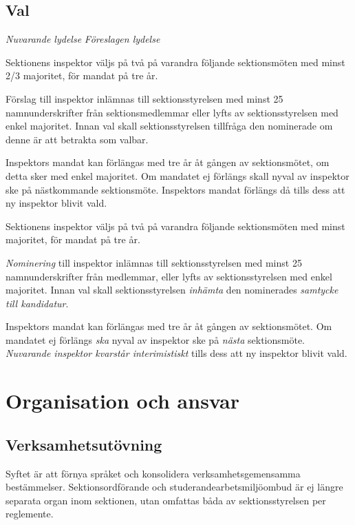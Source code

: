\documentclass{article}
\newenvironment{lydelse}
    {\begin{paracol}{2}%
        \emph{Nuvarande lydelse}%
        \switchcolumn%
        \emph{Föreslagen lydelse}%
    \end{paracol}%
    \begin{enumerate}[label=\thesubsection.\arabic*]%
    \begin{paracol}{2}%
    }{\end{paracol}\end{enumerate}}
\newcommand{\itemb}{\item[\textbullet]}
\begin{document}
\subsection{Val}
\begin{lydelse}
    \itemb Sektionens inspektor väljs på två på varandra följande sektionsmöten med minst 2/3 majoritet, för mandat på tre år. 
	
	\itemb Förslag till inspektor inlämnas till sektionsstyrelsen med minst 25 namnunderskrifter från sektionsmedlemmar eller lyfts av sektionsstyrelsen med enkel majoritet. Innan val skall sektionsstyrelsen tillfråga den nominerade om denne är att betrakta som valbar.
	
    \itemb Inspektors mandat kan förlängas med tre år åt gången av sektionsmötet, om detta sker med enkel majoritet. Om mandatet ej förlängs skall nyval av inspektor ske på nästkommande sektionsmöte. Inspektors mandat förlängs då tills dess att ny inspektor blivit vald.
    
  \switchcolumn
  \setcounter{enumi}{0}
    \item Sektionens inspektor väljs på två på varandra följande sektionsmöten med minst  majoritet, för mandat på tre år. \label{maj:in} 
	
	\item \emph{Nominering} till inspektor inlämnas till sektionsstyrelsen med minst 25 namnunderskrifter från medlemmar, eller lyfts av sektionsstyrelsen med enkel majoritet.
    Innan val skall sektionsstyrelsen \emph{inhämta} den nominerades \emph{samtycke till kandidatur}.
	
	\item Inspektors mandat kan förlängas med tre år åt gången av sektionsmötet.
    Om mandatet ej förlängs \emph{ska} nyval av inspektor ske på \emph{nästa} sektionsmöte.
	\emph{Nuvarande inspektor kvarstår interimistiskt} tills dess att ny inspektor blivit vald.
\end{lydelse}




\section{Organisation och ansvar}
\subsection{Verksamhetsutövning}
Syftet är att förnya språket och konsolidera verksamhetsgemensamma bestämmelser.
Sektionsordförande och studerandearbetsmiljöombud är ej längre separata organ inom sektionen, utan omfattas båda av sektionsstyrelsen per reglemente.
\end{document}
